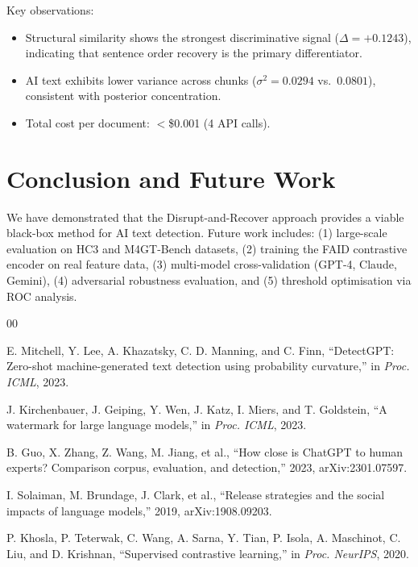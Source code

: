 \documentclass[conference]{IEEEtran}
\begin{document}
Key observations:
\begin{itemize}
    \item Structural similarity shows the strongest discriminative signal
    ($\Delta = +0.1243$), indicating that sentence order recovery is the
    primary differentiator.
    \item AI text exhibits lower variance across chunks ($\sigma^2 = 0.0294$
    vs.\ $0.0801$), consistent with posterior concentration.
    \item Total cost per document: $<$\$0.001 (4 API calls).
\end{itemize}

\section{Conclusion and Future Work}

We have demonstrated that the Disrupt-and-Recover approach provides a
viable black-box method for AI text detection. Future work includes:
(1) large-scale evaluation on HC3 and M4GT-Bench datasets,
(2) training the FAID contrastive encoder on real feature data,
(3) multi-model cross-validation (GPT-4, Claude, Gemini),
(4) adversarial robustness evaluation, and
(5) threshold optimisation via ROC analysis.

\begin{thebibliography}{00}

E. Mitchell, Y. Lee, A. Khazatsky, C. D. Manning, and C. Finn,
``DetectGPT: Zero-shot machine-generated text detection using probability
curvature,'' in \textit{Proc. ICML}, 2023.

J. Kirchenbauer, J. Geiping, Y. Wen, J. Katz, I. Miers, and T. Goldstein,
``A watermark for large language models,'' in \textit{Proc. ICML}, 2023.

B. Guo, X. Zhang, Z. Wang, M. Jiang, et al.,
``How close is ChatGPT to human experts? Comparison corpus, evaluation,
and detection,'' 2023, arXiv:2301.07597.

I. Solaiman, M. Brundage, J. Clark, et al.,
``Release strategies and the social impacts of language models,'' 2019,
arXiv:1908.09203.

P. Khosla, P. Teterwak, C. Wang, A. Sarna, Y. Tian, P. Isola, A. Maschinot,
C. Liu, and D. Krishnan, ``Supervised contrastive learning,'' in
\textit{Proc. NeurIPS}, 2020.

\end{thebibliography}
\end{document}
